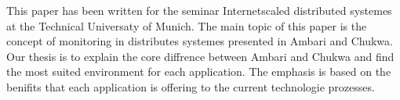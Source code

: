 This paper has been written for the seminar Internetscaled distributed systemes at the Technical Universaty of Munich. The main topic of this paper is the concept of monitoring in distributes systemes presented in Ambari and Chukwa. Our thesis is to explain the core diffrence between Ambari and Chukwa and find the most suited environment for each application. The emphasis is based on the benifits that each application is offering to the current technologie prozesses.